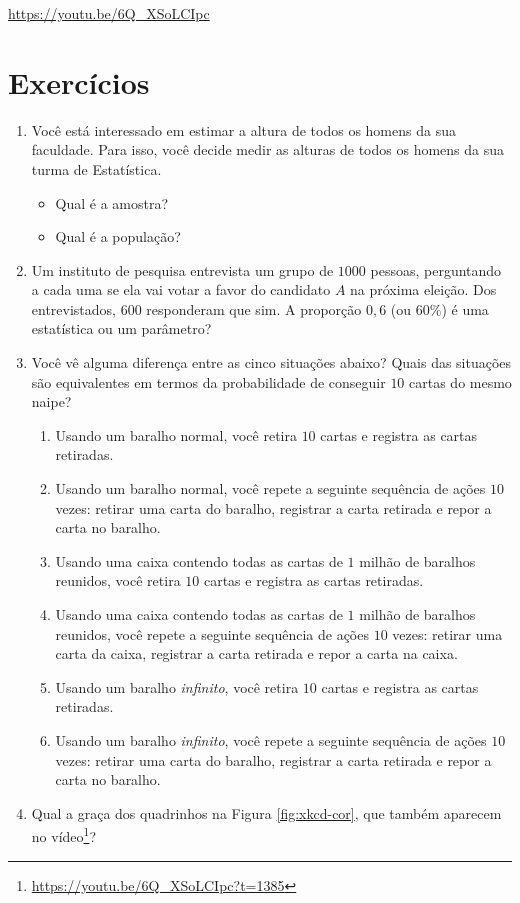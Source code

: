\documentclass[
  11pt]{report}
\DeclareRobustCommand{\href}[2]{#2\footnote{\url{#1}}}
\providecommand{\tightlist}{%
  \setlength{\itemsep}{0pt}\setlength{\parskip}{0pt}}
\begin{document}
\begin{center} \url{https://youtu.be/6Q_XSoLCIpc} \end{center}

\hypertarget{exercuxedcios}{%
\section{Exercícios}\label{exercuxedcios}}

\begin{enumerate}
\def\labelenumi{\arabic{enumi}.}
\item
  Você está interessado em estimar a altura de todos os homens da sua faculdade. Para isso, você decide medir as alturas de todos os homens da sua turma de Estatística.

  \begin{itemize}
  \tightlist
  \item
    Qual é a amostra?
  \item
    Qual é a população?
  \end{itemize}
\item
  Um instituto de pesquisa entrevista um grupo de $1000$ pessoas, perguntando a cada uma se ela vai votar a favor do candidato $A$ na próxima eleição. Dos entrevistados, $600$ responderam que sim. A proporção $0{,}6$ (ou $60\%$) é uma estatística ou um parâmetro?
\item
  Você vê alguma diferença entre as cinco situações abaixo? Quais das situações são equivalentes em termos da probabilidade de conseguir $10$ cartas do mesmo naipe?

  \begin{enumerate}
  \def\labelenumii{\alph{enumii}.}
  \item
    Usando um baralho normal, você retira $10$ cartas e registra as cartas retiradas.
  \item
    Usando um baralho normal, você repete a seguinte sequência de ações $10$ vezes: retirar uma carta do baralho, registrar a carta retirada e repor a carta no baralho.
  \item
    Usando uma caixa contendo todas as cartas de $1$ milhão de baralhos reunidos, você retira $10$ cartas e registra as cartas retiradas.
  \item
    Usando uma caixa contendo todas as cartas de $1$ milhão de baralhos reunidos, você repete a seguinte sequência de ações $10$ vezes: retirar uma carta da caixa, registrar a carta retirada e repor a carta na caixa.
  \item
    Usando um baralho \emph{infinito}, você retira $10$ cartas e registra as cartas retiradas.
  \item
    Usando um baralho \emph{infinito}, você repete a seguinte sequência de ações $10$ vezes: retirar uma carta do baralho, registrar a carta retirada e repor a carta no baralho.
  \end{enumerate}
\item
  Qual a graça dos quadrinhos na Figura \ref{fig:xkcd-cor}, que também \href{https://youtu.be/6Q_XSoLCIpc?t=1385}{aparecem no vídeo}?


\end{enumerate}
\end{document}
